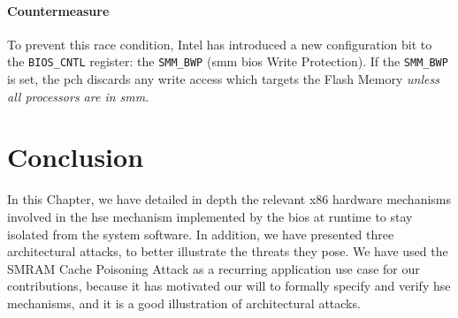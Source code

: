 \paragraph{Countermeasure}
%
To prevent this race condition, Intel has introduced a new configuration bit to
the \texttt{BIOS\_CNTL} register: the \texttt{SMM\_BWP} (\ac{smm} \ac{bios}
Write Protection).
%
If the \texttt{SMM\_BWP} is set, the \ac{pch} discards any write access which targets
the Flash Memory \emph{unless all processors are in \ac{smm}}.

\section{Conclusion}
\label{sec:usecase:conclusion}

In this Chapter, we have detailed in depth the relevant x86 hardware mechanisms
involved in the \ac{hse} mechanism implemented by the \ac{bios} at runtime to
stay isolated from the system software.
%
In addition, we have presented three architectural attacks, to better illustrate
the threats they pose.
%
We have used the SMRAM Cache Poisoning Attack as a recurring application use
case for our contributions, because it has motivated our will to formally
specify and verify \ac{hse} mechanisms, and it is a good illustration of
architectural attacks.
